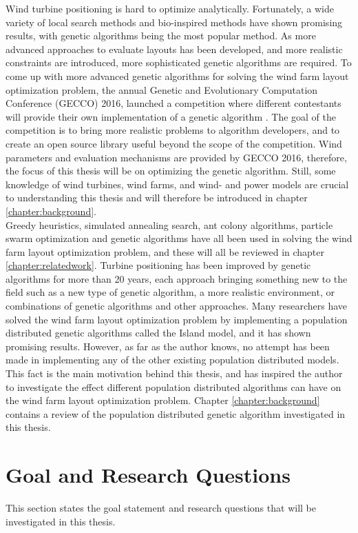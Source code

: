 \noindent Wind turbine positioning is hard to optimize analytically. Fortunately, a wide variety of local search methods and bio-inspired methods have shown promising results, with genetic algorithms being the most popular method. As more advanced approaches to evaluate layouts has been developed, and more realistic constraints are introduced, more sophisticated genetic algorithms are required. To come up with more advanced genetic algorithms for solving the wind farm layout optimization problem, the annual Genetic and Evolutionary Computation Conference (GECCO) 2016, launched a competition where different contestants will provide their own implementation of a genetic algorithm \citep{url2}. The goal of the competition is to bring more realistic problems to algorithm developers, and to create an open source library useful beyond the scope of the competition. Wind parameters and evaluation mechanisms are provided by GECCO 2016, therefore, the focus of this thesis will be on optimizing the genetic algorithm. Still, some knowledge of wind turbines, wind farms, and wind- and power models are crucial to understanding this thesis and will therefore be introduced in chapter \ref{chapter:background}. \\

\noindent Greedy heuristics, simulated annealing search, ant colony algorithms, particle swarm optimization and genetic algorithms have all been used in solving the wind farm layout optimization problem, and these will all be reviewed in chapter \ref{chapter:relatedwork}. Turbine positioning has been improved by genetic algorithms for more than 20 years, each approach bringing something new to the field such as a new type of genetic algorithm, a more realistic environment, or combinations of genetic algorithms and other approaches. Many researchers have solved the wind farm layout optimization problem by implementing a population distributed genetic algorithms called the Island model, and it has shown promising results. However, as far as the author knows, no attempt has been made in implementing any of the other existing population distributed models. This fact is the main motivation behind this thesis, and has inspired the author to investigate the effect different population distributed algorithms can have on the wind farm layout optimization problem. Chapter \ref{chapter:background} contains a review of the population distributed genetic algorithm investigated in this thesis.


\section{Goal and Research Questions}\label{section:goal&researchquestions}
This section states the goal statement and research questions that will be investigated in this thesis. \\

